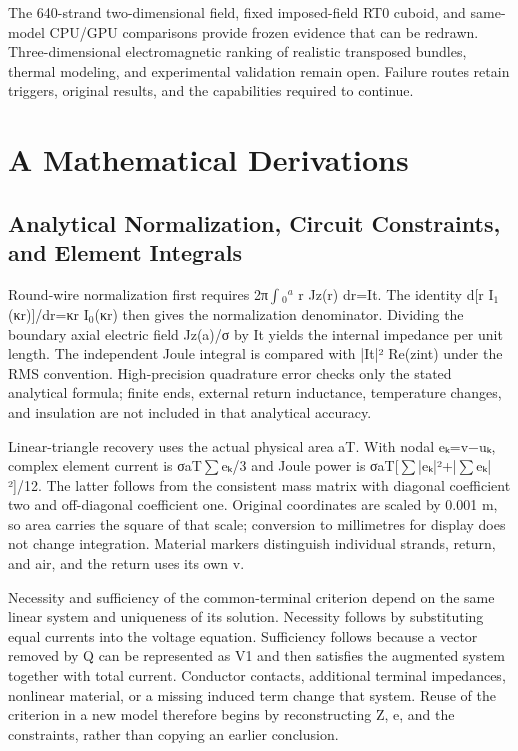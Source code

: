 \documentclass[journal,10pt]{IEEEtran}
\begin{document}
The 640-strand two-dimensional field, fixed imposed-field RT0 cuboid, and same-model CPU/GPU comparisons provide frozen evidence that can be redrawn. Three-dimensional electromagnetic ranking of realistic transposed bundles, thermal modeling, and experimental validation remain open. Failure routes retain triggers, original results, and the capabilities required to continue.


\FloatBarrier
\section*{A Mathematical Derivations}
\hypertarget{chapter-A}{}
\subsection*{Analytical Normalization, Circuit Constraints, and Element Integrals}
\hypertarget{A.report_derivation.heading}{}
Round-wire normalization first requires 2π\(\int\)\(_0\)\(^a\) r Jz(r) dr=It. The identity d[r I\(_1\)(κr)]/dr=κr I\(_0\)(κr) then gives the normalization denominator. Dividing the boundary axial electric field Jz(a)/σ by It yields the internal impedance per unit length. The independent Joule integral is compared with |It|² Re(zint) under the RMS convention. High-precision quadrature error checks only the stated analytical formula; finite ends, external return inductance, temperature changes, and insulation are not included in that analytical accuracy.


Linear-triangle recovery uses the actual physical area aT. With nodal eₖ=v−uₖ, complex element current is σaT\(\sum\)eₖ/3 and Joule power is σaT[\(\sum\)|eₖ|²+|\(\sum\)eₖ|²]/12. The latter follows from the consistent mass matrix with diagonal coefficient two and off-diagonal coefficient one. Original coordinates are scaled by 0.001 m, so area carries the square of that scale; conversion to millimetres for display does not change integration. Material markers distinguish individual strands, return, and air, and the return uses its own v.


Necessity and sufficiency of the common-terminal criterion depend on the same linear system and uniqueness of its solution. Necessity follows by substituting equal currents into the voltage equation. Sufficiency follows because a vector removed by Q can be represented as V1 and then satisfies the augmented system together with total current. Conductor contacts, additional terminal impedances, nonlinear material, or a missing induced term change that system. Reuse of the criterion in a new model therefore begins by reconstructing Z, e, and the constraints, rather than copying an earlier conclusion.
\end{document}
